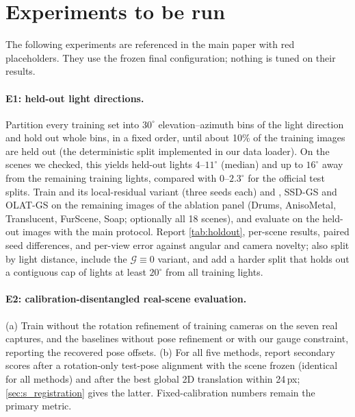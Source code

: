\documentclass[10pt,twocolumn,letterpaper]{article}
\begin{document}
\section{Experiments to be run}
\label{sec:s_torun}
The following experiments are referenced in the main paper with red placeholders.
They use the frozen final configuration; nothing is tuned on their results.

\paragraph{E1: held-out light directions.}
Partition every training set into $30^\circ$ elevation--azimuth bins of the light direction and hold out whole bins, in a fixed order, until about 10\% of the training images are held out (the deterministic split implemented in our data loader).
On the scenes we checked, this yields held-out lights $4$--$11^\circ$ (median) and up to $16^\circ$ away from the remaining training lights, compared with $0$--$2.3^\circ$ for the official test splits.
Train \ours and its local-residual variant (three seeds each) and \gsthree, SSD-GS and OLAT-GS on the remaining images of the ablation panel (Drums, AnisoMetal, Translucent, FurScene, Soap; optionally all 18 scenes), and evaluate on the held-out images with the main protocol.
Report \cref{tab:holdout}, per-scene results, paired seed differences, and per-view error against angular and camera novelty; also split by light distance, include the $\mathcal G\equiv0$ variant, and add a harder split that holds out a contiguous cap of lights at least $20^\circ$ from all training lights.

\paragraph{E2: calibration-disentangled real-scene evaluation.}
(a) Train \ours without the rotation refinement of training cameras on the seven real captures, and the baselines without pose refinement or with our gauge constraint, reporting the recovered pose offsets.
(b) For all five methods, report secondary scores after a rotation-only test-pose alignment with the scene frozen (identical for all methods) and after the best global 2D translation within 24\,px; \cref{sec:s_registration} gives the latter.
Fixed-calibration numbers remain the primary metric.
\end{document}
